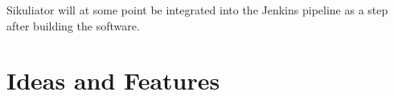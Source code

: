 \documentclass[a4paper,twocolumn]{article}
\newcommand{\VMC}[0]{VMC®}
\newcommand{\Sik}[0]{Sikuliator}
\begin{document}
\Sik{} will at some point be integrated into the Jenkins\cite{Jenkins} pipeline as a step after building the software.

\section{Ideas and Features}

%
%
%
\end{document}
